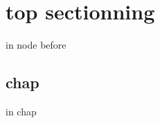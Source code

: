 \documentclass{book}
\newcommand{\Texinfothechapterheading}{}
\newcommand{\Texinfoheadingchaptername}{\chaptername}
\newcommand{\Texinfochapter}[1]{\chapter{#1}
\renewcommand{\Texinfothechapterheading}{\Texinfoheadingchaptername{} \thechapter{} }%
}%
\renewcommand{\_}{\Texinfounderscore\discretionary{}{}{}}
\begin{document}
\part*{{top sectionning}}
\label{anchor:node-before}%

in node before

\label{anchor:Top}%
\Texinfochapter{{chap}}
\label{anchor:chap}%

in chap
\end{document}

